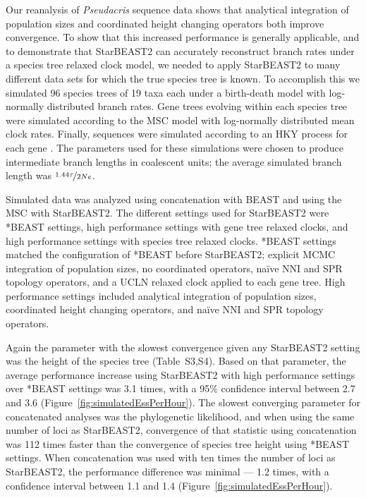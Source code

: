 \documentclass[nogrid]{MBE}%
\begin{document}
Our reanalysis of \textit{Pseudacris} sequence data shows that analytical
integration of population sizes and coordinated height changing operators both
improve convergence. To show that this increased performance is generally
applicable, and to demonstrate that StarBEAST2 can accurately reconstruct branch
rates under a species tree relaxed clock model, we needed to apply StarBEAST2 to
many different data sets for which the true species tree is known. To accomplish
this we simulated 96 species trees of 19 taxa each under a birth-death model
with log-normally distributed branch rates. Gene trees evolving within each
species tree were simulated according to the MSC model with
log-normally distributed mean clock rates. Finally, sequences were simulated
according to an HKY process for each gene \citep{Hasegawa1985, Goldman1993}. The
parameters used for these simulations were chosen to produce intermediate
branch lengths in coalescent units; the average simulated branch length was
$\nicefrac{1.44\tau}{2Ne}$.

Simulated data was analyzed using concatenation with BEAST and using the MSC with
StarBEAST2. The different settings used for StarBEAST2 were *BEAST settings,
high performance settings with gene tree relaxed clocks, and high performance settings with
species tree relaxed clocks. *BEAST settings matched the configuration of *BEAST
before StarBEAST2; explicit MCMC integration of population sizes, no
coordinated operators, na\"ive NNI and SPR topology operators, and a UCLN
relaxed clock applied to each gene tree. High performance settings included analytical
integration of population sizes, coordinated height changing operators, and
na\"ive NNI and SPR topology operators.

Again the parameter with the slowest convergence given any StarBEAST2 setting
was the height of the species tree (Table~S3,S4). Based on that parameter, the
average performance increase using StarBEAST2 with high performance settings over
*BEAST settings was 3.1 times, with a 95\% confidence interval between 2.7 and
3.6 (Figure~\ref{fig:simulatedEssPerHour}). The slowest converging parameter for
concatenated analyses was the phylogenetic likelihood, and when using the same
number of loci as StarBEAST2, convergence of that statistic using concatenation
was 112 times faster than the convergence of species tree height using
*BEAST settings. When concatenation was used with ten times the
number of loci as StarBEAST2, the performance difference was minimal --- 1.2
times, with a confidence interval between 1.1 and 1.4
(Figure~\ref{fig:simulatedEssPerHour}).
\end{document}
